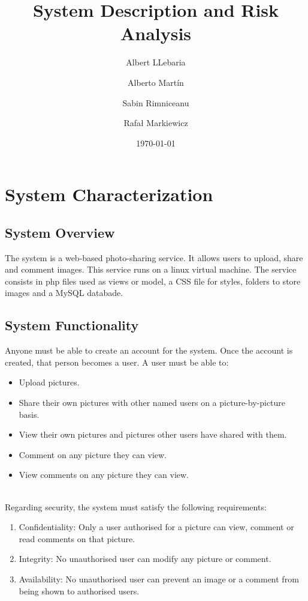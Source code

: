 \documentclass{article}
\title{\huge\sffamily\bfseries System Description and Risk Analysis}
\author{Albert LLebaria \and Alberto Martín \and Sabin Rimniceanu \and Rafał Markiewicz}
\date{\today}
\begin{document}
\maketitle


\tableofcontents
\pagebreak


\section{System Characterization}

\subsection{System Overview}
The system is a web-based photo-sharing service. It allows users to upload, share and comment images. This service runs on a linux virtual machine. The service consists in php files used as views or model, a CSS file for styles, folders to store images and a MySQL databade.

\subsection{System Functionality} 
Anyone must be able to create an account for the system. Once the account is created, that person becomes a user. A user must be able to:
\begin{itemize}  
\setlength\itemsep{0em}
\item Upload pictures.
\item Share their own pictures with other named users on a picture-by-picture basis.
\item View their own pictures and pictures other users have shared with them. 
\item Comment on any picture they can view.
\item View comments on any picture they can view.
\end{itemize}
\  \\
Regarding security, the system must satisfy the following requirements:
\begin{enumerate}  
\setlength\itemsep{0em}
\item Confidentiality: Only a user authorised for a picture can view, comment or read comments on that picture.
\item Integrity: No unauthorised user can modify any picture or comment.
\item Availability: No unauthorised user can prevent an image or a comment from being shown to authorised users.
\end{enumerate}
\end{document}
